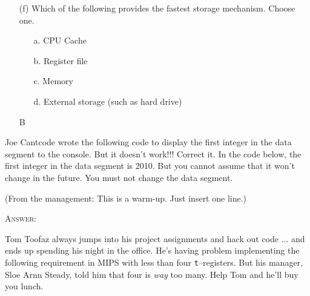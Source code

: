 \begin{itemize}
\item[(f)]
  Which of the following provides the fastest
  storage mechanism. Choose one.
  \begin{itemize}
  \item[a.] CPU Cache
  \item[b.] Register file
  \item[c.] Memory
  \item[d.] External storage (such as hard drive)
  \end{itemize}
  \ANSWER\vspace{4mm}
  \begin{answercode}
  B
  \end{answercode}
\end{itemize}

\newpage
\nextq
Joe Cantcode wrote the following code to display the first
integer in the data segment 
to the
console.
But it doesn't work!!! Correct it.
In the code below, the first integer in the data segment is 2010.
But you cannot assume that it won't change in the future.
You must not change the data segment.

(From the management: This is a warm-up. Just insert one line.)

\textsc{Answer:}

\newpage
\nextq
Tom Toofaz always jumps into his project assignments and hack out code ... and
ends up spending his night in the office.
He's having problem implementing the following requirement
in MIPS with less than four \verb!t!--registers.
But his manager, Sloe Arnn Steady, told him that four is \textit{way} too many.
Help Tom and he'll buy you lunch.

